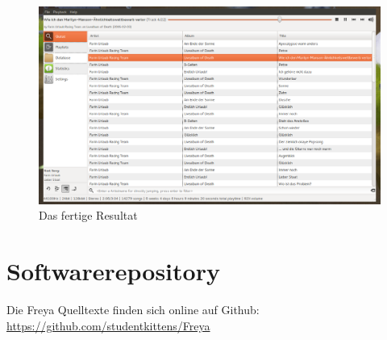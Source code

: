 \documentclass[11pt]{scrreprt}
\begin{document}
\begin{figure}[htb!]
    \centering
    \includegraphics[scale=0.58,angle=90]{./gfx/misc/final_result.png}
    \caption{Das fertige Resultat}
    \label{pic_final_result}
\end{figure}

\chapter{Softwarerepository}
Die Freya Quelltexte finden sich online auf Github:
\\
\url{https://github.com/studentkittens/Freya}
\end{document}
